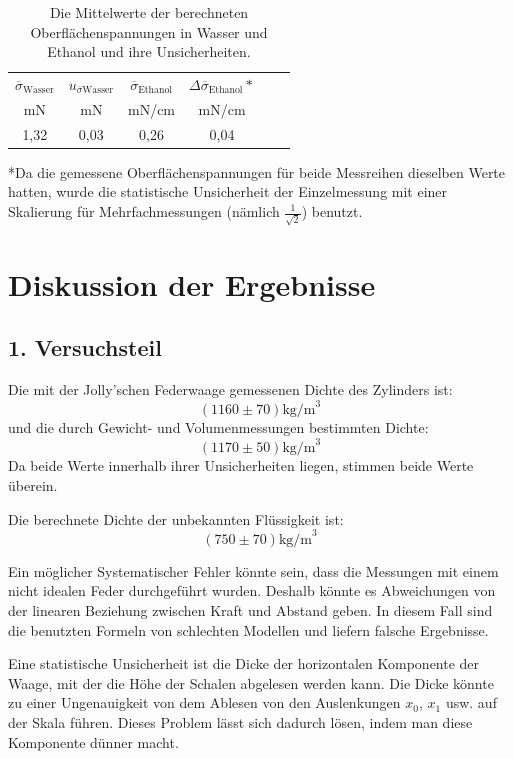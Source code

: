 \documentclass[11pt,a4paper]{article} %
\begin{document}
\begin{table}[h]
	\begin{tabular*}{0.99\textwidth}{@{\extracolsep{\fill}}cccccc}
		\toprule
		$\overline{\sigma}_{\textrm{Wasser}}$ & $u_{\overline{\sigma}\textrm{Wasser}}$ & $\overline{\sigma}_{\textrm{Ethanol}}$ & $\Delta\overline{\sigma}_{\textrm{Ethanol}}*$  \\
		mN & mN &  mN/cm & mN/cm   \\
		\midrule
		1,32 & 0,03 & 0,26  & 0,04 \\
		
		\bottomrule
	\end{tabular*}
	\caption{Die Mittelwerte der berechneten Oberflächenspannungen in Wasser und Ethanol und ihre Unsicherheiten.}
	\label{tabelle7}
\end{table}
*Da die gemessene Oberflächenspannungen für beide Messreihen dieselben Werte hatten, wurde die statistische Unsicherheit der Einzelmessung mit einer Skalierung für Mehrfachmessungen (nämlich $\frac{1}{\sqrt{2}}$) benutzt.

\section{Diskussion der Ergebnisse}
\subsection{1. Versuchsteil}
Die mit der Jolly'schen Federwaage gemessenen Dichte des Zylinders ist:
$$(1160\pm 70)\textrm{kg/m}^3$$
und die durch Gewicht- und Volumenmessungen bestimmten Dichte:
$$(1170\pm 50)\textrm{kg/m}^3$$
Da beide Werte innerhalb ihrer Unsicherheiten liegen, stimmen beide Werte überein. 

Die berechnete Dichte der unbekannten Flüssigkeit ist:
$$(750 \pm 70) \textrm{kg/m}^3$$

Ein möglicher Systematischer Fehler könnte sein, dass die Messungen mit einem nicht idealen Feder durchgeführt wurden. Deshalb könnte es Abweichungen von der linearen Beziehung zwischen Kraft und Abstand geben. In diesem Fall sind die benutzten Formeln von schlechten Modellen und liefern falsche Ergebnisse. 

Eine statistische Unsicherheit ist die Dicke der horizontalen Komponente der Waage, mit der die Höhe der Schalen abgelesen werden kann. Die Dicke könnte zu einer Ungenauigkeit von dem Ablesen von den Auslenkungen $x_0$, $x_1$ usw. auf der Skala führen. Dieses Problem lässt sich dadurch lösen, indem man diese Komponente dünner macht. 
\end{document}
